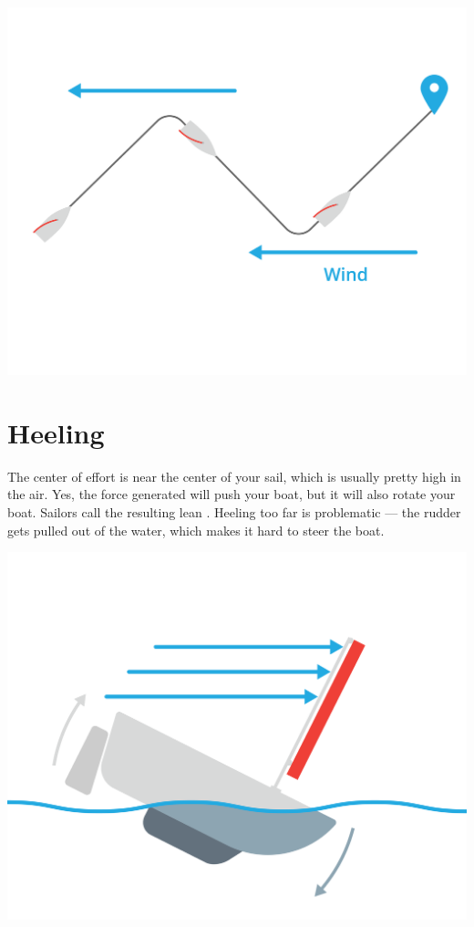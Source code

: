 \begin{center}
    \includegraphics[width=.75\textwidth]{tacking.png}
    
\end{center}

\section{Heeling}

The center of effort is near the center of your sail,  which is usually pretty high in the air. Yes, the force generated will push your boat,  but it will also rotate your boat.  Sailors call
the resulting lean . Heeling too far is problematic --- the rudder gets pulled out of the water, which makes it hard to steer the boat.

\begin{center}
    \includegraphics[width=.75\textwidth]{heeling.png}
    
\end{center}

